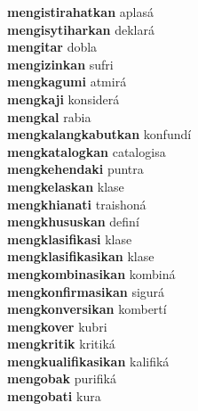 \textbf{mengistirahatkan } aplasá \\
\textbf{mengisytiharkan } deklará \\
\textbf{mengitar } dobla \\
\textbf{mengizinkan } sufri \\
\textbf{mengkagumi } atmirá \\
\textbf{mengkaji } konsiderá \\
\textbf{mengkal } rabia \\
\textbf{mengkalangkabutkan } konfundí \\
\textbf{mengkatalogkan } catalogisa \\
\textbf{mengkehendaki } puntra \\
\textbf{mengkelaskan } klase \\
\textbf{mengkhianati } traishoná \\
\textbf{mengkhususkan } definí \\
\textbf{mengklasifikasi } klase \\
\textbf{mengklasifikasikan } klase \\
\textbf{mengkombinasikan } kombiná \\
\textbf{mengkonfirmasikan } sigurá \\
\textbf{mengkonversikan } kombertí \\
\textbf{mengkover } kubri \\
\textbf{mengkritik } kritiká \\
\textbf{mengkualifikasikan } kalifiká \\
\textbf{mengobak } purifiká \\
\textbf{mengobati } kura \\
